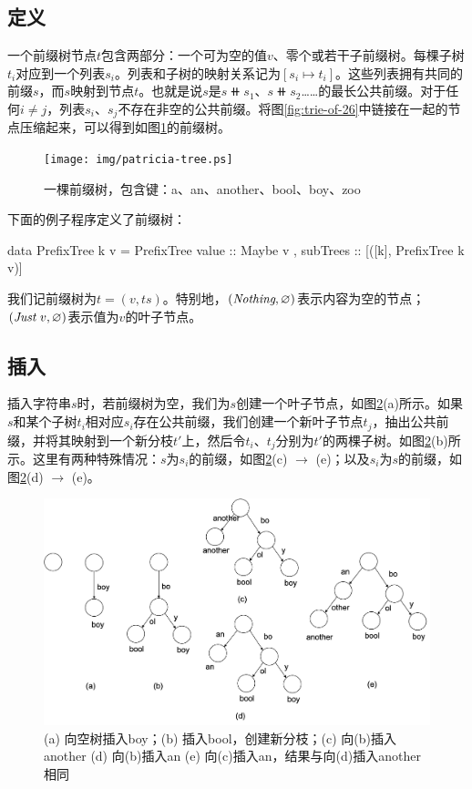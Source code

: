 \documentclass[b5paper]{ctexart}
\begin{document}
\subsection{定义}
一个前缀树节点$t$包含两部分：一个可为空的值$v$、零个或若干子前缀树。每棵子树$t_i$对应到一个列表$s_i$。列表和子树的映射关系记为$[s_i \mapsto t_i]$。这些列表拥有共同的前缀$s$，而$s$映射到节点$t$。也就是说$s$是$s \doubleplus s_1$、$s \doubleplus s_2$……的最长公共前缀。对于任何$i \neq j$，列表$s_i$、$s_j$不存在非空的公共前缀。将图\ref{fig:trie-of-26}中链接在一起的节点压缩起来，可以得到如图\ref{fig:patricia-tree}的前缀树。

\begin{figure}[htbp]
  \centering
  \texttt{[image: img/patricia-tree.ps]}
  \caption{一棵前缀树，包含键：a、an、another、bool、boy、zoo}
  \label{fig:patricia-tree}
\end{figure}

下面的例子程序定义了前缀树：

\begin{Haskell}
data PrefixTree k v = PrefixTree { value :: Maybe v
                                 , subTrees :: [([k], PrefixTree k v)]}
\end{Haskell}

我们记前缀树为$t = (v, ts)$。特别地，$(\textit{Nothing}, \varnothing)$表示内容为空的节点；$(\textit{Just}\ v, \varnothing)$表示值为$v$的叶子节点。

\subsection{插入}

插入字符串$s$时，若前缀树为空，我们为$s$创建一个叶子节点，如图\ref{fig:patricia-insert}(a)所示。如果$s$和某个子树$t_i$相对应$s_i$存在公共前缀，我们创建一个新叶子节点$t_j$，抽出公共前缀，并将其映射到一个新分枝$t'$上，然后令$t_i$、$t_j$分别为$t'$的两棵子树。如图\ref{fig:patricia-insert}(b)所示。这里有两种特殊情况：$s$为$s_i$的前缀，如图\ref{fig:patricia-insert}(c) $\to$ (e)；以及$s_i$为$s$的前缀，如图\ref{fig:patricia-insert}(d) $\to$ (e)。

\begin{figure}[htbp]
  \centering
  \includegraphics[scale=0.4]{img/prefix-tree-insert.png}
  \caption{(a) 向空树插入boy；(b) 插入bool，创建新分枝；(c) 向(b)插入another (d) 向(b)插入an (e) 向(c)插入an，结果与向(d)插入another相同}
  \label{fig:patricia-insert}
\end{figure}
\end{document}
